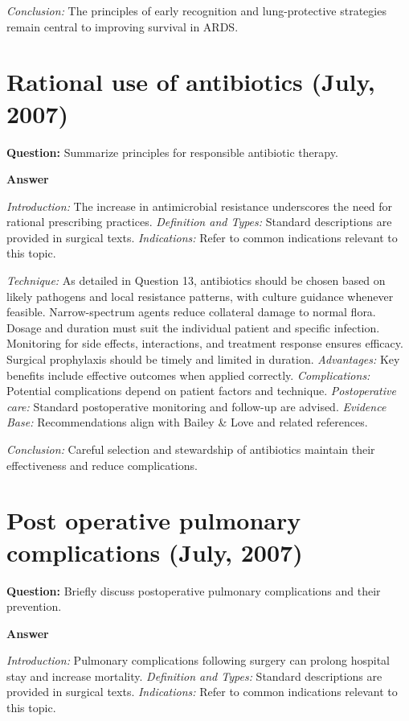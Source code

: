 \documentclass{article}
\begin{document}
\emph{Conclusion:} The principles of early recognition and lung-protective strategies remain central to improving survival in ARDS.


\section{Rational use of antibiotics (July, 2007)}

\textbf{Question:} Summarize principles for responsible antibiotic therapy.

\textbf{Answer}

\emph{Introduction:} The increase in antimicrobial resistance underscores the need for rational prescribing practices.
\emph{Definition and Types:} Standard descriptions are provided in surgical texts.
\emph{Indications:} Refer to common indications relevant to this topic.

\emph{Technique:} As detailed in Question 13, antibiotics should be chosen based on likely pathogens and local resistance patterns, with culture guidance whenever feasible. Narrow-spectrum agents reduce collateral damage to normal flora. Dosage and duration must suit the individual patient and specific infection. Monitoring for side effects, interactions, and treatment response ensures efficacy. Surgical prophylaxis should be timely and limited in duration.
\emph{Advantages:} Key benefits include effective outcomes when applied correctly.
\emph{Complications:} Potential complications depend on patient factors and technique.
\emph{Postoperative care:} Standard postoperative monitoring and follow-up are advised.
\emph{Evidence Base:} Recommendations align with Bailey & Love and related references.

\emph{Conclusion:} Careful selection and stewardship of antibiotics maintain their effectiveness and reduce complications.


\section{Post operative pulmonary complications (July, 2007)}

\textbf{Question:} Briefly discuss postoperative pulmonary complications and their prevention.

\textbf{Answer}

\emph{Introduction:} Pulmonary complications following surgery can prolong hospital stay and increase mortality.
\emph{Definition and Types:} Standard descriptions are provided in surgical texts.
\emph{Indications:} Refer to common indications relevant to this topic.
\end{document}
